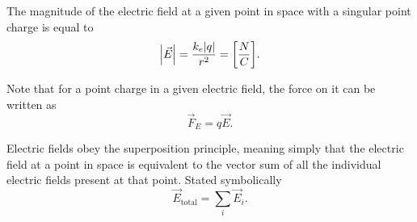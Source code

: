 \documentclass[../notes.tex]{subfiles}
\begin{document}
The magnitude of the electric field at a given point in space with a singular point charge is equal to
\[
	\qty|\vec{E}| = \frac{k_{e} \qty|q|}{r^2} = \qty[\frac{N}{C}]
.\]

Note that for a point charge in a given electric field, the force on it can be written as
\[
	\vec{F}_{E} = q \vec{E}
.\]


Electric fields obey the superposition principle, meaning simply that the electric field at a point in space is equivalent to the vector sum of all the individual electric fields present at that point. Stated symbolically
\[
	\vec{E}_\text{total} = \sum_i \vec{E}_i
.\]
\end{document}
